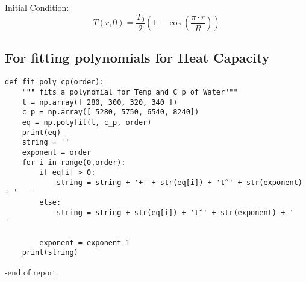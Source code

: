 \documentclass[12pt,letterpaper]{article}
\begin{document}
Initial Condition:
\[T(r,0) = \frac{T_0}{2} (1-\cos{(\frac{\pi \cdot r}{R})}) \]


\begin{appendices}

\section{For fitting polynomials for Heat Capacity}

\begin{verbatim}
def fit_poly_cp(order):
    """ fits a polynomial for Temp and C_p of Water"""
    t = np.array([ 280, 300, 320, 340 ])
    c_p = np.array([ 5280, 5750, 6540, 8240])
    eq = np.polyfit(t, c_p, order)
    print(eq)
    string = ''
    exponent = order
    for i in range(0,order):
        if eq[i] > 0:
            string = string + '+' + str(eq[i]) + 't^' + str(exponent) + '   '
        else:
            string = string + str(eq[i]) + 't^' + str(exponent) + '   '
            
        exponent = exponent-1
    print(string)

\end{verbatim}


\end{appendices}
\pagebreak

-end of report.
\end{document}
